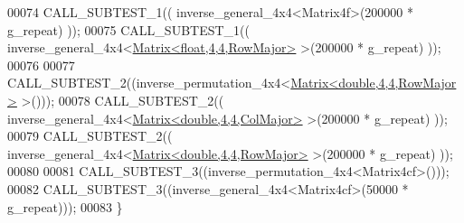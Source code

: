 \begin{DoxyCode}
00074   CALL\_SUBTEST\_1(( inverse\_general\_4x4<Matrix4f>(200000 * g\_repeat) ));
00075   CALL\_SUBTEST\_1(( inverse\_general\_4x4<\hyperlink{group___core___module_class_eigen_1_1_matrix}{Matrix<float,4,4,RowMajor>} >(200000 * 
      g\_repeat) ));
00076 
00077   CALL\_SUBTEST\_2((inverse\_permutation\_4x4<\hyperlink{group___core___module_class_eigen_1_1_matrix}{Matrix<double,4,4,RowMajor>} >()));
00078   CALL\_SUBTEST\_2(( inverse\_general\_4x4<\hyperlink{group___core___module_class_eigen_1_1_matrix}{Matrix<double,4,4,ColMajor>} >(200000 * 
      g\_repeat) ));
00079   CALL\_SUBTEST\_2(( inverse\_general\_4x4<\hyperlink{group___core___module_class_eigen_1_1_matrix}{Matrix<double,4,4,RowMajor>} >(200000 * 
      g\_repeat) ));
00080 
00081   CALL\_SUBTEST\_3((inverse\_permutation\_4x4<Matrix4cf>()));
00082   CALL\_SUBTEST\_3((inverse\_general\_4x4<Matrix4cf>(50000 * g\_repeat)));
00083 \}
\end{DoxyCode}
